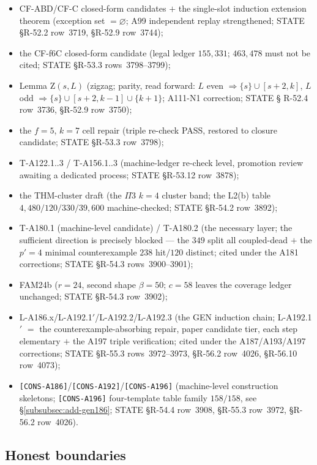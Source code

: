 \begin{itemize}
\item CF-ABD/CF-C closed-form candidates $+$ the single-slot induction
extension theorem (exception set $=\varnothing$; A99 independent replay
strengthened; STATE \S R-52.2 row~3719, \S R-52.9 row~3744);
\item the CF-f6C closed-form candidate (legal ledger \textbf{$155{,}331$};
$463{,}478$ must not be cited; STATE \S R-53.3 rows~3798--3799);
\item Lemma Z$(s,L)$ (zigzag; parity, read forward: $L$ even
$\Rightarrow\{s\}\cup[s+2,k]$, $L$ odd
$\Rightarrow\{s\}\cup[s+2,k-1]\cup\{k+1\}$; A111-N1 correction; STATE \S
R-52.4 row~3736, \S R-52.9 row~3750);
\item the $f=5$, $k=7$ cell repair (triple re-check PASS, restored to
closure candidate; STATE \S R-53.3 row~3798);
\item T-A122.1..3 / T-A156.1..3 (machine-ledger re-check level, promotion
review awaiting a dedicated process; STATE \S R-53.12 row~3878);
\item the THM-cluster draft (the $\Pi$3 $k=4$ cluster band; the L2(b)
table $4{,}480/120/330/39{,}600$ machine-checked; STATE \S R-54.2
row~3892);
\item T-A180.1 (machine-level candidate) / T-A180.2 (the necessary layer;
the sufficient direction is precisely blocked --- the $349$ split all
coupled-dead $+$ the $p'=4$ minimal counterexample $238$ hit$/120$
distinct; cited under the A181 corrections; STATE \S R-54.3
rows~3900--3901);
\item FAM24b ($r=24$, second shape $\beta=50$; $c=58$ leaves the coverage
ledger unchanged; STATE \S R-54.3 row~3902);
\item L-A186.x/L-A192.1$'$/L-A192.2/L-A192.3 (the GEN induction chain;
L-A192.1$'$ $=$ the counterexample-absorbing repair, paper candidate tier,
each step elementary $+$ the A197 triple verification; cited under the
A187/A193/A197 corrections; STATE \S R-55.3 rows~3972--3973, \S R-56.2
row~4026, \S R-56.10 row~4073);
\item \texttt{[CONS-A186]}/\texttt{[CONS-A192]}/\texttt{[CONS-A196]}
(machine-level construction skeletons; \texttt{[CONS-A196]} four-template
table family $158/158$, see \S\ref{subsubsec:add-gen186}; STATE \S R-54.4
row~3908, \S R-55.3 row~3972, \S R-56.2 row~4026).
\end{itemize}

\subsection{Honest boundaries}\label{subsec:add-honest}

